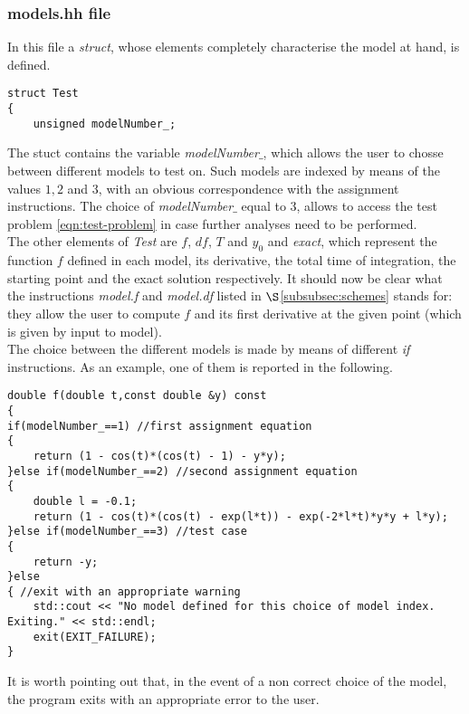 \documentclass[11pt]{article}
\theoremstyle{theorem}
\theoremstyle{definition}
\begin{document}
\subsubsection{models.hh file}
\label{subsubsec:models}
In this file a \emph{struct}, whose elements completely characterise the model at hand, is defined.

\begin{lstlisting}
struct Test
{
	unsigned modelNumber_;
\end{lstlisting}

The stuct contains the variable \emph{modelNumber$\_$}, which allows the user to chosse between different models to test on. Such models are indexed by means of the values $1, 2$ and $3$, with an obvious correspondence with the assignment instructions. The choice of \emph{modelNumber$\_$} equal to 3, allows to access the test problem \eqref{eqn:test-problem} in case further analyses need to be performed.\\
The other elements of \emph{Test} are $f$, $df$, $T$ and $y_0$ and \emph{exact}, which represent the function $f$ defined in each model, its derivative, the total time of integration, the starting point and the exact solution respectively. It should now be clear what the instructions \emph{model.f} and \emph{model.df} listed in $\S$\ref{subsubsec:schemes} stands for: they allow the user to compute $f$ and its first derivative at the given point (which is given by input to model).\\
The choice between the different models is made by means of different \emph{if} instructions. As an example, one of them is reported in the following.\\

\begin{lstlisting}
double f(double t,const double &y) const
{
if(modelNumber_==1) //first assignment equation
{
	return (1 - cos(t)*(cos(t) - 1) - y*y);
}else if(modelNumber_==2) //second assignment equation
{
	double l = -0.1;
	return (1 - cos(t)*(cos(t) - exp(l*t)) - exp(-2*l*t)*y*y + l*y);
}else if(modelNumber_==3) //test case
{
	return -y;
}else
{ //exit with an appropriate warning
	std::cout << "No model defined for this choice of model index. Exiting." << std::endl;
	exit(EXIT_FAILURE);
}
\end{lstlisting}

It is worth pointing out that, in the event of a non correct choice of the model, the program exits with an appropriate error to the user.\\
\end{document}
